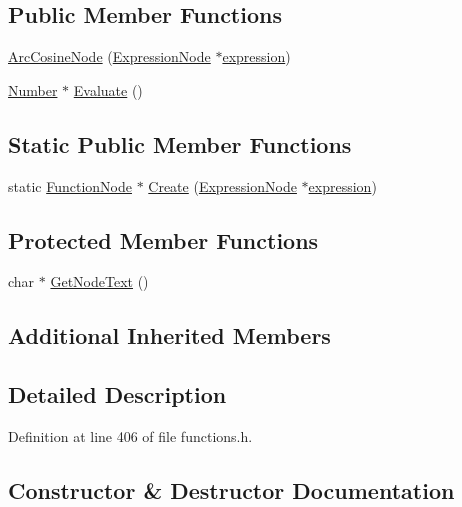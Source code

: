 \subsection*{Public Member Functions}
\begin{DoxyCompactItemize}
\item 
\hyperlink{classArcCosineNode_aa152120e8ec71299525f1e8054a32f04}{Arc\+Cosine\+Node} (\hyperlink{classExpressionNode}{Expression\+Node} $\ast$\hyperlink{classFunctionNode_ad7577b179a1937aaf8a0058bb5b546dc}{expression})
\item 
\hyperlink{structNumber}{Number} $\ast$ \hyperlink{classArcCosineNode_a67a999999c34f043bd65778669d5d819}{Evaluate} ()
\end{DoxyCompactItemize}
\subsection*{Static Public Member Functions}
\begin{DoxyCompactItemize}
\item 
static \hyperlink{classFunctionNode}{Function\+Node} $\ast$ \hyperlink{classArcCosineNode_a72c4decd858fbf8db24f81581fd693cb}{Create} (\hyperlink{classExpressionNode}{Expression\+Node} $\ast$\hyperlink{classFunctionNode_ad7577b179a1937aaf8a0058bb5b546dc}{expression})
\end{DoxyCompactItemize}
\subsection*{Protected Member Functions}
\begin{DoxyCompactItemize}
\item 
char $\ast$ \hyperlink{classArcCosineNode_a9f519aed56ef36e4bf6c1ffbe269a015}{Get\+Node\+Text} ()
\end{DoxyCompactItemize}
\subsection*{Additional Inherited Members}


\subsection{Detailed Description}


Definition at line 406 of file functions.\+h.



\subsection{Constructor \& Destructor Documentation}
